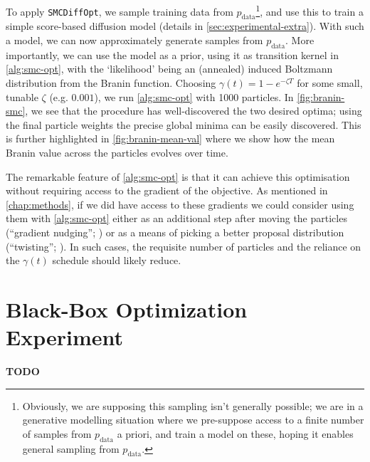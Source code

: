 To apply \texttt{SMCDiffOpt}, we sample training data from $p_{\text{data}}$\footnote{Obviously, we
are supposing this sampling isn't generally possible; we are in a generative modelling situation
where we pre-suppose access to a finite number of samples from $p_{\text{data}}$ a priori, and
train a model on these, hoping it enables general sampling from $p_{\text{data}}$.}, and use this
to train a simple score-based diffusion model (details in \autoref{sec:experimental-extra}). With such
a model, we can now approximately generate samples from $p_{\text{data}}$. More importantly, we can
use the model as a prior, using it as transition kernel in \autoref{alg:smc-opt}, with the `likelihood'
being an (annealed) induced Boltzmann distribution from the Branin function. Choosing
$\gamma(t) = 1 - e^{-\zeta T}$ for some small, tunable $\zeta$ (e.g. $0.001$), we run
\autoref{alg:smc-opt} with 1000 particles. In \autoref{fig:branin-smc}, we see that the procedure has
well-discovered the two desired optima; using the final particle weights the precise global minima
can be easily discovered. This is further highlighted in \autoref{fig:branin-mean-val} where we show
how the mean Branin value across the particles evolves over time.

The remarkable feature of \autoref{alg:smc-opt} is that it can achieve this optimisation without
requiring access to the gradient of the objective. As mentioned in \autoref{chap:methods}, if we did
have access to these gradients we could consider using them with \autoref{alg:smc-opt} either as an
additional step after moving the particles
(``gradient nudging''; \parencite{akyildizNudgingParticleFilter2020}) or as a means of picking a
better proposal distribution (``twisting''; \parencite{wuPracticalAsymptoticallyExact2023}). In
such cases, the requisite number of particles and the reliance on the $\gamma(t)$ schedule should
likely reduce.

\section{Black-Box Optimization Experiment} \label{sec:superconductor}

\textbf{TODO}
